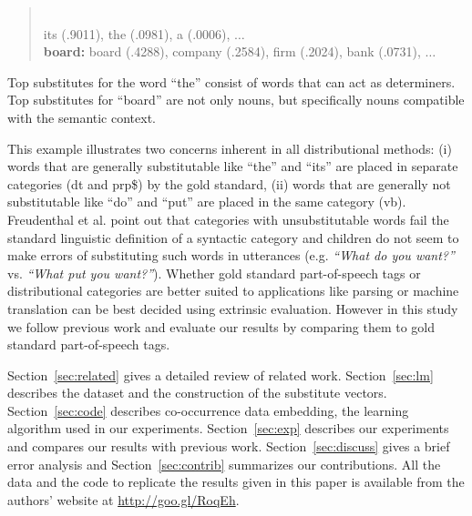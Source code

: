 \documentclass[11pt]{article}
\begin{document}
\begin{quotation}
\\

 its (.9011), the (.0981), a (.0006), $\ldots$\\
{\bf board:} board (.4288), company (.2584), firm (.2024), bank (.0731), $\ldots$
\end{quotation}

Top substitutes for the word ``the'' consist of words that can act as
determiners.  Top substitutes for ``board'' are not only nouns, but
specifically nouns compatible with the semantic context.

This example illustrates two concerns inherent in all distributional
methods: (i) words that are generally substitutable like ``the'' and
``its'' are placed in separate categories ({\sc dt} and {\sc prp\$})
by the gold standard, (ii) words that are generally not substitutable
like ``do'' and ``put'' are placed in the same category ({\sc vb}).
Freudenthal et al.  point out
that categories with unsubstitutable words fail the standard
linguistic definition of a syntactic category and children do not seem
to make errors of substituting such words in utterances
(e.g. {\em``What do you want?''}  vs. {\em *``What put you want?''}).
Whether gold standard part-of-speech tags or distributional categories
are better suited to applications like parsing or machine translation
can be best decided using extrinsic evaluation.  However in this study
we follow previous work and evaluate our results by comparing them to
gold standard part-of-speech tags.

Section~\ref{sec:related} gives a detailed review of related work.
Section~\ref{sec:lm} describes the dataset and the construction of the
substitute vectors.  Section~\ref{sec:code} describes co-occurrence
data embedding, the learning algorithm used in our experiments.
Section~\ref{sec:exp} describes our experiments and compares our
results with previous work.  Section~\ref{sec:discuss} gives a brief
error analysis and Section~\ref{sec:contrib} summarizes our
contributions.  All the data and the code to replicate the results
given in this paper is available from the authors' website at
\mbox{\url{http://goo.gl/RoqEh}}.


\end{document}
